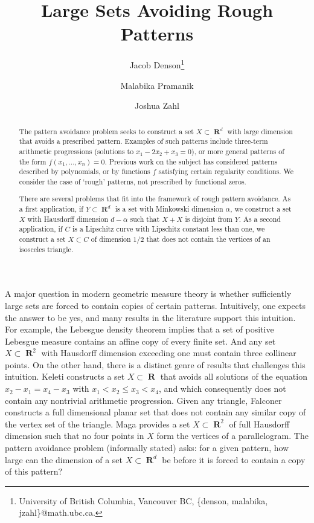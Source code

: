 \documentclass[dvipsnames,letterpaper,12pt]{article}
\title{Large Sets Avoiding Rough Patterns}
\author{Jacob Denson\thanks{University of British Columbia, Vancouver BC, \{denson, malabika, jzahl\}@math.ubc.ca.} \and Malabika Pramanik\footnotemark[1] \and Joshua Zahl\footnotemark[1]}
\numberwithin{equation}{section}
\theoremstyle{plain}
\theoremstyle{remark}
\DeclareMathOperator{\RR}{\mathbf{R}}
\begin{document}
\maketitle

\begin{abstract}
	The pattern avoidance problem seeks to construct a set $X\subset \RR^d$ with large dimension that avoids a prescribed pattern. Examples of such patterns include three-term arithmetic progressions (solutions to $x_1 - 2x_2 + x_3 = 0$), or more general patterns of the form $f(x_1, \dots, x_n) = 0$. Previous work on the subject has considered patterns described by polynomials, or by functions $f$ satisfying certain regularity conditions. We consider the case of `rough' patterns, not prescribed by functional zeros.

	There are several problems that fit into the framework of rough pattern avoidance. As a first application, if $Y \subset \RR^d$ is a set with Minkowski dimension $\alpha$, we construct a set $X$ with Hausdorff dimension $d-\alpha$ such that $X+X$ is disjoint from $Y$. As a second application, if $C$ is a Lipschitz curve with Lipschitz constant less than one, we construct a set $X \subset C$ of dimension $1/2$ that does not contain the vertices of an isosceles triangle.
\end{abstract}



A major question in modern geometric measure theory is whether sufficiently large sets are forced to contain copies of certain patterns. Intuitively, one expects the answer to be yes, and many results in the literature support this intuition. For example, the Lebesgue density theorem implies that a set of positive Lebesgue measure contains an affine copy of every finite set. And any set $X \subset \RR^2$ with Hausdorff dimension exceeding one must contain three collinear points. On the other hand, there is a distinct genre of results that challenges this intuition. Keleti \cite{KeletiDimOneSet} constructs a set $X \subset \RR$ that avoids all solutions of the equation $x_2 - x_1 = x_4 - x_3$ with $x_1 < x_2 \leq x_3 < x_4$, and which consequently does not contain any nontrivial arithmetic progression. Given any triangle, Falconer \cite{FalconerPaper} constructs a full dimensional planar set that does not contain any similar copy of the vertex set of the triangle. Maga \cite{Maga} provides a set $X \subset \RR^2$ of full Hausdorff dimension such that no four points in $X$ form the vertices of a parallelogram. The pattern avoidance problem (informally stated) asks: for a given pattern, how large can the dimension of a set $X \subset \RR^d$ be before it is forced to contain a copy of this pattern? 
\end{document}
